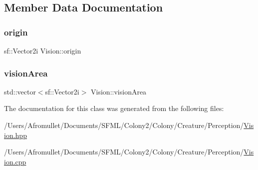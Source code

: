 \subsection{Member Data Documentation}
\mbox{\label{class_vision_ab68e6f7a554cda7c398168ca150dd4c0}} 
\subsubsection{\texorpdfstring{origin}{origin}}
{\footnotesize\ttfamily sf\+::\+Vector2i Vision\+::origin\hspace{0.3cm}{\ttfamily [private]}}

\mbox{\label{class_vision_a04430228cfbaaa15871d28a68ad7e1b1}} 
\subsubsection{\texorpdfstring{vision\+Area}{visionArea}}
{\footnotesize\ttfamily std\+::vector$<$sf\+::\+Vector2i$>$ Vision\+::vision\+Area\hspace{0.3cm}{\ttfamily [private]}}



The documentation for this class was generated from the following files\+:\begin{DoxyCompactItemize}
\item 
/\+Users/\+Afromullet/\+Documents/\+S\+F\+M\+L/\+Colony2/\+Colony/\+Creature/\+Perception/\mbox{\hyperlink{_vision_8hpp}{Vision.\+hpp}}\item 
/\+Users/\+Afromullet/\+Documents/\+S\+F\+M\+L/\+Colony2/\+Colony/\+Creature/\+Perception/\mbox{\hyperlink{_vision_8cpp}{Vision.\+cpp}}\end{DoxyCompactItemize}
